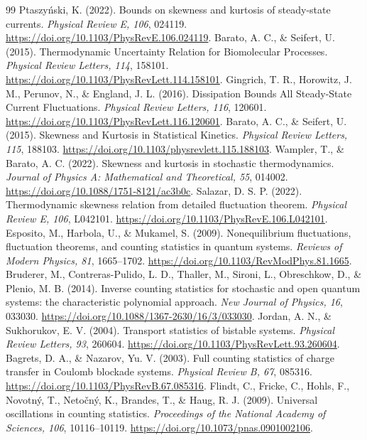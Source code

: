 \documentclass[11pt,a4paper]{article}
\theoremstyle{remark}\newtheorem{remark}[theorem]{Remark}
\begin{document}
\begingroup\small\setlength{\parskip}{2pt}
\begin{thebibliography}{99}
 Ptaszy\'nski, K. (2022). Bounds on skewness and kurtosis of steady-state currents. \emph{Physical Review E, 106}, 024119. \url{https://doi.org/10.1103/PhysRevE.106.024119}.
 Barato, A. C., \& Seifert, U. (2015). Thermodynamic Uncertainty Relation for Biomolecular Processes. \emph{Physical Review Letters, 114}, 158101. \url{https://doi.org/10.1103/PhysRevLett.114.158101}.
 Gingrich, T. R., Horowitz, J. M., Perunov, N., \& England, J. L. (2016). Dissipation Bounds All Steady-State Current Fluctuations. \emph{Physical Review Letters, 116}, 120601. \url{https://doi.org/10.1103/PhysRevLett.116.120601}.
 Barato, A. C., \& Seifert, U. (2015). Skewness and Kurtosis in Statistical Kinetics. \emph{Physical Review Letters, 115}, 188103. \url{https://doi.org/10.1103/physrevlett.115.188103}.
 Wampler, T., \& Barato, A. C. (2022). Skewness and kurtosis in stochastic thermodynamics. \emph{Journal of Physics A: Mathematical and Theoretical, 55}, 014002. \url{https://doi.org/10.1088/1751-8121/ac3b0c}.
 Salazar, D. S. P. (2022). Thermodynamic skewness relation from detailed fluctuation theorem. \emph{Physical Review E, 106}, L042101. \url{https://doi.org/10.1103/PhysRevE.106.L042101}.
 Esposito, M., Harbola, U., \& Mukamel, S. (2009). Nonequilibrium fluctuations, fluctuation theorems, and counting statistics in quantum systems. \emph{Reviews of Modern Physics, 81}, 1665--1702. \url{https://doi.org/10.1103/RevModPhys.81.1665}.
 Bruderer, M., Contreras-Pulido, L. D., Thaller, M., Sironi, L., Obreschkow, D., \& Plenio, M. B. (2014). Inverse counting statistics for stochastic and open quantum systems: the characteristic polynomial approach. \emph{New Journal of Physics, 16}, 033030. \url{https://doi.org/10.1088/1367-2630/16/3/033030}.
 Jordan, A. N., \& Sukhorukov, E. V. (2004). Transport statistics of bistable systems. \emph{Physical Review Letters, 93}, 260604. \url{https://doi.org/10.1103/PhysRevLett.93.260604}.
 Bagrets, D. A., \& Nazarov, Yu. V. (2003). Full counting statistics of charge transfer in Coulomb blockade systems. \emph{Physical Review B, 67}, 085316. \url{https://doi.org/10.1103/PhysRevB.67.085316}.
 Flindt, C., Fricke, C., Hohls, F., Novotn\'y, T., Neto\v{c}n\'y, K., Brandes, T., \& Haug, R. J. (2009). Universal oscillations in counting statistics. \emph{Proceedings of the National Academy of Sciences, 106}, 10116--10119. \url{https://doi.org/10.1073/pnas.0901002106}.

\end{thebibliography}
\end{document}
